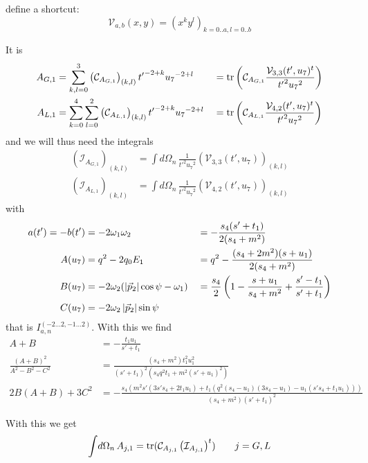 define a shortcut:
\begin{equation}
\mathcal V_{a,b}(x,y) = \left(x^{k} y^{l}\right)_{k=0..a,l=0..b}
\end{equation}

It is
\begin{align}
A_{G,1} &= \sum_{k,l=0}^{3} \left(\mathcal C_{A_{G,1}}\right)_{(k,l)} {t'}^{-2+k} {u_7}^{-2+l} &&= \operatorname{\text{tr}}\left(\mathcal C_{A_{G,1}} \frac{\mathcal V_{3,3}(t',u_7)^t}{{t'}^2{u_7}^2}\right)\\
A_{L,1} &= \sum_{k=0}^{4}\sum_{l=0}^{2} \left(\mathcal C_{A_{L,1}}\right)_{(k,l)} {t'}^{-2+k} {u_7}^{-2+l} &&= \operatorname{\text{tr}}\left(\mathcal C_{A_{L,1}} \frac{\mathcal V_{4,2}(t',u_7)^t}{{t'}^2{u_7}^2}\right)
\end{align}
and we will thus need the integrals
\begin{align}
\left(\mathcal I_{A_{G,1}}\right)_{(k,l)} &= \int\!d\Omega_n\,\frac 1 {{t'}^2{u_7}^2}\left(\mathcal V_{3,3}(t',u_7)\right)_{(k,l)}\\
\left(\mathcal I_{A_{L,1}}\right)_{(k,l)} &= \int\!d\Omega_n\,\frac 1 {{t'}^2{u_7}^2}\left(\mathcal V_{4,2}(t',u_7)\right)_{(k,l)}
\end{align}
with
\begin{align}
a(t') = -b(t') &= -2\omega_1\omega_2 &&= -\frac{s_4(s'+t_1)}{2(s_4+m^2)}\\
A(u_7) &= q^2-2q_0E_1 &&= q^2-\frac{(s_4+2m^2)(s+u_1)}{2(s_4+m^2)}\\
B(u_7) &= -2\omega_2(\left|\vec p_2\right|\cos\psi-\omega_1) &&=\frac {s_4}{2}\left(1-\frac{s+u_1}{s_4+m^2}+\frac{s'-t_1}{s'+t_1}\right)\\
C(u_7) &= -2\omega_2\left|\vec p_2\right|\sin\psi
\end{align}
that is $I_{a,n}^{(-2\ldots 2,-1\ldots 2)}$. With this we find
\begin{align}
A+B &= -\frac{t_1 u_1}{s'+t_1}\\
\frac{(A+B)^2}{A^2-B^2-C^2} &= \frac{(s_4+m^2)t_1^2u_1^2}{(s'+t_1)^2(s_4q^2t_1 + m^2(s'+u_1)^2)}\\
2B(A+B)+3C^2 &= -\frac{s_4(m^2 s'(3s' s_4 + 2t_1u_1)+t_1(q^2(s_4-u_1)(3s_4-u_1)-u_1(s's_4 + t_1u_1)))}{(s_4+m^2)(s'+t_1)^2}
\end{align}

With this we get
\begin{equation}
\int\!d\Omega_n\,A_{j,1} = \operatorname{\text{tr}}(\mathcal C_{A_{j,1}} \left(\mathcal I_{A_{j,1}}\right)^t) \qquad j=G,L
\end{equation}

